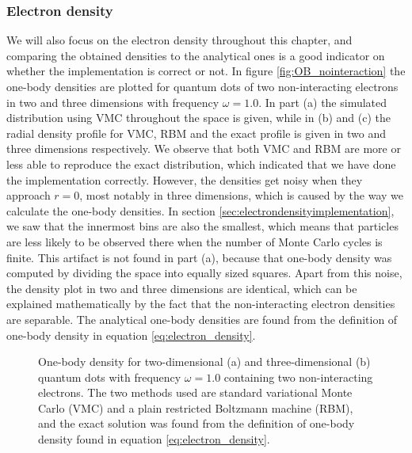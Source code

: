\subsubsection{Electron density}
We will also focus on the electron density throughout this chapter, and comparing the obtained densities to the analytical ones is a good indicator on whether the implementation is correct or not. In figure \eqref{fig:OB_nointeraction} the one-body densities are plotted for quantum dots of two non-interacting electrons in two and three dimensions with frequency $\omega=1.0$. In part (a) the simulated distribution using VMC throughout the space is given, while in (b) and (c) the radial density profile for VMC, RBM and the exact profile is given in two and three dimensions respectively. We observe that both VMC and RBM are more or less able to reproduce the exact distribution, which indicated that we have done the implementation correctly. However, the densities get noisy when they approach $r=0$, most notably in three dimensions, which is caused by the way we calculate the one-body densities. In section \ref{sec:electrondensityimplementation}, we saw that the innermost bins are also the smallest, which means that particles are less likely to be observed there when the number of Monte Carlo cycles is finite. This artifact is not found in part (a), because that one-body density was computed by dividing the space into equally sized squares. Apart from this noise, the density plot in two and three dimensions are identical, which can be explained mathematically by the fact that the non-interacting electron densities are separable. The analytical one-body densities are found from the definition of one-body density in equation \eqref{eq:electron_density}.

\begin{figure}[h]
	\centering
	\hspace{-0.5cm}
	\caption{One-body density for two-dimensional (a) and three-dimensional (b) quantum dots with frequency $\omega=1.0$ containing two non-interacting electrons. The two methods used are standard variational Monte Carlo (VMC) and a plain restricted Boltzmann machine (RBM), and the exact solution was found from the definition of one-body density found in equation \eqref{eq:electron_density}.}%
	\label{fig:OB_nointeraction}
\end{figure}

